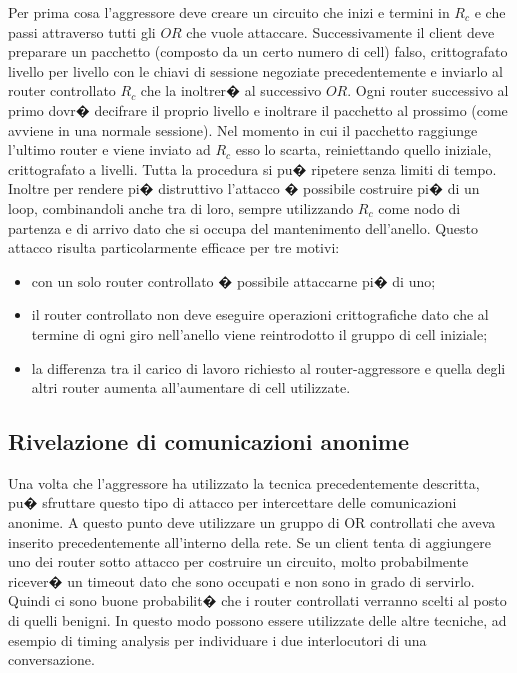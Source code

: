 Per prima cosa l'aggressore deve creare un circuito che inizi e termini in $R_{c}$ e che passi attraverso tutti gli $OR$ che vuole attaccare. Successivamente il client deve preparare un pacchetto (composto da un certo numero di cell) falso, crittografato livello per livello con le chiavi di sessione negoziate precedentemente e inviarlo al router controllato $R_{c}$ che la inoltrer� al successivo $OR$. Ogni router successivo al primo dovr� decifrare il proprio livello e inoltrare il pacchetto al prossimo (come avviene in una normale sessione). Nel momento in cui il pacchetto raggiunge l'ultimo router e viene inviato ad $R_{c}$ esso lo scarta, reiniettando quello iniziale, crittografato a livelli. Tutta la procedura si pu� ripetere senza limiti di tempo. Inoltre per rendere pi� distruttivo l'attacco � possibile costruire pi� di un loop, combinandoli anche tra di loro, sempre utilizzando $R_{c}$ come nodo di partenza e di arrivo dato che si occupa del mantenimento dell'anello.
Questo attacco risulta particolarmente efficace per tre motivi:
\begin{itemize}
	\item con un solo router controllato � possibile attaccarne pi� di uno;
	\item il router controllato non deve eseguire operazioni crittografiche dato che al termine di ogni giro nell'anello viene reintrodotto il gruppo di cell iniziale;
	\item la differenza tra il carico di lavoro richiesto al router-aggressore e quella degli altri router aumenta all'aumentare di cell utilizzate. 
\end{itemize}



\subsection{Rivelazione di comunicazioni anonime}
Una volta che l'aggressore ha utilizzato la tecnica precedentemente descritta, pu� sfruttare questo tipo di attacco per intercettare delle comunicazioni anonime. A questo punto deve utilizzare un gruppo di OR controllati che aveva inserito precedentemente all'interno della rete. Se un client tenta di aggiungere uno dei router sotto attacco per costruire un circuito, molto probabilmente ricever� un timeout dato che sono occupati e non sono in grado di servirlo. Quindi ci sono buone probabilit� che i router controllati verranno scelti al posto di quelli benigni. In questo modo possono essere utilizzate delle altre tecniche, ad esempio di timing analysis \cite{lochidd} per individuare i due interlocutori di una conversazione. 

